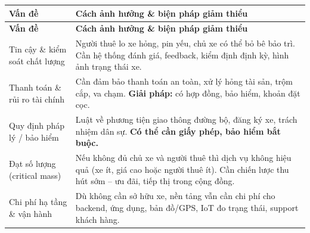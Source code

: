 \renewcommand{\arraystretch}{1.5} 
\begin{longtable}{|>{\raggedright\arraybackslash}p{3cm}|>{\raggedright\arraybackslash}p{12.5cm}|}
\hline
\textbf{Vấn đề} & \textbf{Cách ảnh hưởng \& biện pháp giảm thiểu} \\ \hline
\endfirsthead
\hline
\textbf{Vấn đề} & \textbf{Cách ảnh hưởng \& biện pháp giảm thiểu} \\ \hline
\endhead

Tin cậy \& kiểm soát chất lượng & Người thuê lo xe hỏng, pin yếu, chủ xe có thể bỏ bê bảo trì. \newline Cần hệ thống đánh giá, feedback, kiểm định định kỳ, hình ảnh trạng thái xe. \\ \hline
Thanh toán \& rủi ro tài chính & Cần đảm bảo thanh toán an toàn, xử lý hỏng tài sản, trộm cắp, va chạm. \newline \textbf{Giải pháp:} có hợp đồng, bảo hiểm, khoản đặt cọc. \\ \hline
Quy định pháp lý / bảo hiểm & Luật về phương tiện giao thông đường bộ, đăng ký xe, trách nhiệm dân sự. \textbf{Có thể cần giấy phép, bảo hiểm bắt buộc.} \\ \hline
Đạt số lượng (critical mass) & Nếu không đủ chủ xe và người thuê thì dịch vụ không hiệu quả (xe ít, giá cao hoặc người thuê ít). \newline Cần chiến lược thu hút sớm – ưu đãi, tiếp thị trong cộng đồng. \\ \hline
Chi phí hạ tầng \& vận hành & Dù không cần sở hữu xe, nền tảng vẫn cần chi phí cho backend, ứng dụng, bản đồ/GPS, IoT đo trạng thái, support khách hàng. \\ \hline

\end{longtable}